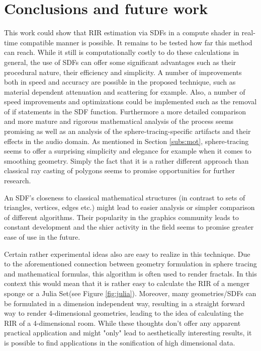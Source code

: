 \documentclass[twoside,a4paper]{article}
\begin{document}
\section{Conclusions and future work}
\label{sec:concl}

This work could show that RIR estimation via SDFs in a compute shader in real-time compatible manner is possible. It remains to be tested how far this method can reach. While it still is computationally costly to do these calculations in general, the use of SDFs can offer some significant advantages such as their procedural nature, their efficiency and simplicity. A number of improvements both in speed and accuracy are possible in the proposed technique, such as material dependent attenuation and scattering for example. Also, a number of speed improvements and optimizations could be implemented such as the removal of if statements in the SDF function. Furthermore a more detailed comparison and more mature and rigorous mathematical analysis of the process seems promising as well as an analysis of the sphere-tracing-specific artifacts and their effects in the audio domain. As mentioned in Section \ref{subs:mot}, sphere-tracing seems to offer a surprising simplicity and elegance for example when it comes to smoothing geometry. Simply the fact that it is a rather different approach than classical ray casting of polygons seems to promise opportunities for further research. 

An SDF's closeness to classical mathematical structures (in contrast to sets of triangles, vertices, edges etc.) might lead to easier analysis or simpler comparison of different algorithms. Their popularity in the graphics community leads to constant development and the shier activity in the field seems to promise greater ease of use in the future. \

Certain rather experimental ideas also are easy to realize in this technique. Due to the aforementioned connection between geometry formulation in sphere tracing and mathematical formulas, this algorithm is often used to render fractals. In this context this would mean that it is rather easy to calculate the RIR of a menger sponge or a Julia Set(see Figure \ref{fig:julia}). Moreover, many geometries/SDFs can be formulated in a dimension independent way, resulting in a straight forward way to render 4-dimensional geometries, leading to the idea of calculating the RIR of a 4-dimensional room. While these thoughts don't offer any apparent practical application and might "only" lead to aesthetically interesting results, it is possible to find applications in the sonification of high dimensional data.
\end{document}
